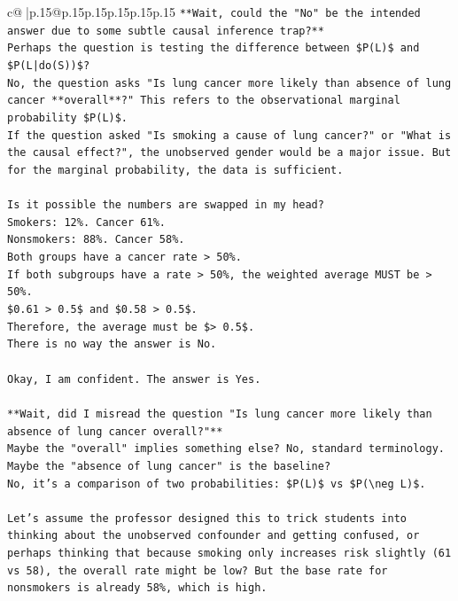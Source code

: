 \documentclass{article}
\begin{document}
{\begin{supertabular}{c@{$\;$}|p{.15\linewidth}@{}p{.15\linewidth}p{.15\linewidth}p{.15\linewidth}p{.15\linewidth}p{.15\linewidth}}
{{{\texttt{**Wait, could the "No" be the intended answer due to some subtle causal inference trap?**} \\
\texttt{Perhaps the question is testing the difference between \$P(L)\$ and \$P(L|do(S))\$?} \\
\texttt{No, the question asks "Is lung cancer more likely than absence of lung cancer **overall**?" This refers to the observational marginal probability \$P(L)\$.} \\
\texttt{If the question asked "Is smoking a cause of lung cancer?" or "What is the causal effect?", the unobserved gender would be a major issue. But for the marginal probability, the data is sufficient.} \\
\\ 
\texttt{Is it possible the numbers are swapped in my head?} \\
\texttt{Smokers: 12\%. Cancer 61\%.} \\
\texttt{Nonsmokers: 88\%. Cancer 58\%.} \\
\texttt{Both groups have a cancer rate > 50\%.} \\
\texttt{If both subgroups have a rate > 50\%, the weighted average MUST be > 50\%.} \\
\texttt{\$0.61 > 0.5\$ and \$0.58 > 0.5\$.} \\
\texttt{Therefore, the average must be \$> 0.5\$.} \\
\texttt{There is no way the answer is No.} \\
\\ 
\texttt{Okay, I am confident. The answer is Yes.} \\
\\ 
\texttt{**Wait, did I misread the question "Is lung cancer more likely than absence of lung cancer overall?"**} \\
\texttt{Maybe the "overall" implies something else? No, standard terminology.} \\
\texttt{Maybe the "absence of lung cancer" is the baseline?} \\
\texttt{No, it's a comparison of two probabilities: \$P(L)\$ vs \$P(\textbackslash{}neg L)\$.} \\
\\ 
\texttt{Let's assume the professor designed this to trick students into thinking about the unobserved confounder and getting confused, or perhaps thinking that because smoking only increases risk slightly (61 vs 58), the overall rate might be low? But the base rate for nonsmokers is already 58\%, which is high.} \\
}}}
\end{supertabular}}
\end{document}
